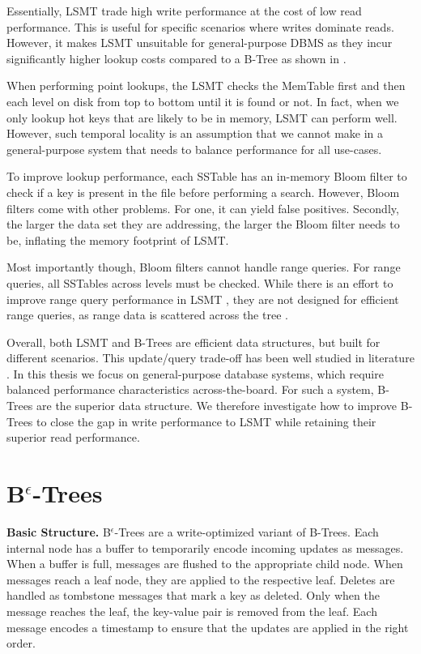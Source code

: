 
Essentially, \ac{LSMT} trade high write performance at the cost of low read performance.
This is useful for specific scenarios where writes dominate reads.
However, it makes \ac{LSMT} unsuitable for general-purpose \ac{DBMS} as they incur significantly higher lookup costs compared to a B-Tree as shown in \cite{gorrod2017wiredtiger}.

When performing point lookups, the \ac{LSMT} checks the MemTable first and then each level on disk from top to bottom until it is found or not.
In fact, when we only lookup hot keys that are likely to be in memory, \ac{LSMT} can perform well.
However, such temporal locality is an assumption that we cannot make in a general-purpose system that needs to balance performance for all use-cases.

To improve lookup performance, each SSTable has an in-memory Bloom filter to check if a key is present in the file before performing a search.
However, Bloom filters come with other problems. 
For one, it can yield false positives.
Secondly, the larger the data set they are addressing, the larger the Bloom filter needs to be, inflating the memory footprint of \ac{LSMT}.

Most importantly though, Bloom filters cannot handle range queries.
For range queries, all SSTables across levels must be checked. 
While there is an effort to improve range query performance in \ac{LSMT} \cite{zhong2021remix}, they are not designed for efficient range queries, as range data is scattered across the tree \cite{sarkar2022lsmt}.

Overall, both \ac{LSMT} and B-Trees are efficient data structures, but built for different scenarios.
This update/query trade-off has been well studied in literature \cite{brodal2003lower}.
In this thesis we focus on general-purpose database systems, which require balanced performance characteristics across-the-board.
For such a system, B-Trees are the superior data structure.
We therefore investigate how to improve B-Trees to close the gap in write performance to \ac{LSMT} while retaining their superior read performance.


\section{B$^\epsilon$-Trees}
\textbf{Basic Structure.}
B$^\epsilon$-Trees \cite{bender2015epsilon} are a write-optimized variant of B-Trees.
Each internal node has a buffer to temporarily encode incoming updates as messages.
When a buffer is full, messages are flushed to the appropriate child node.
When messages reach a leaf node, they are applied to the respective leaf.
Deletes are handled as tombstone messages that mark a key as deleted. Only when the message reaches the leaf, the key-value pair is removed from the leaf.
Each message encodes a timestamp to ensure that the updates are applied in the right order.

